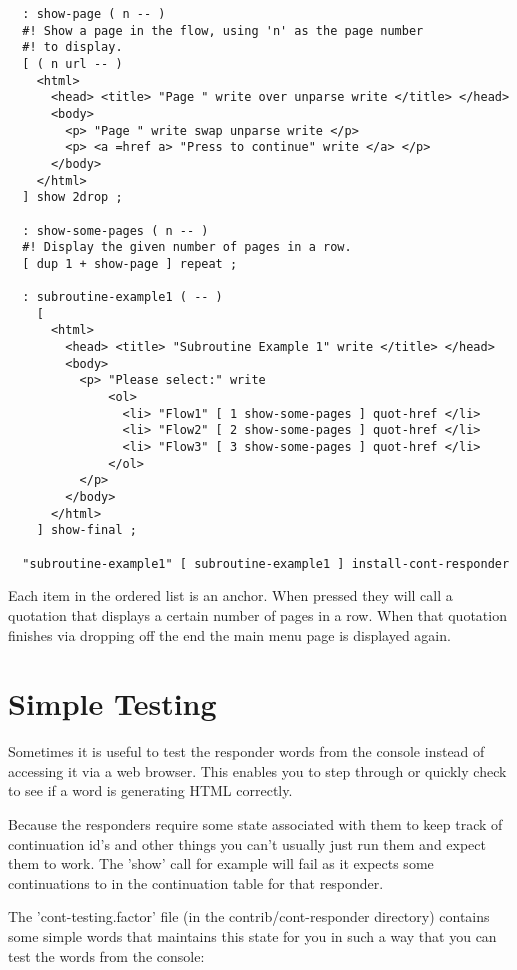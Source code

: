 \begin{verbatim}
  : show-page ( n -- )
  #! Show a page in the flow, using 'n' as the page number
  #! to display. 
  [ ( n url -- )
    <html>
      <head> <title> "Page " write over unparse write </title> </head>
      <body>
        <p> "Page " write swap unparse write </p>
        <p> <a =href a> "Press to continue" write </a> </p>
      </body>
    </html>   
  ] show 2drop ;

  : show-some-pages ( n -- )
  #! Display the given number of pages in a row.
  [ dup 1 + show-page ] repeat ;

  : subroutine-example1 ( -- )
    [
      <html>
        <head> <title> "Subroutine Example 1" write </title> </head>
        <body>
          <p> "Please select:" write 
              <ol>
                <li> "Flow1" [ 1 show-some-pages ] quot-href </li>
                <li> "Flow2" [ 2 show-some-pages ] quot-href </li>
                <li> "Flow3" [ 3 show-some-pages ] quot-href </li>
              </ol>
          </p>
        </body>
      </html>
    ] show-final ;

  "subroutine-example1" [ subroutine-example1 ] install-cont-responder
\end{verbatim}

Each item in the ordered list is an anchor. When pressed they will
call a quotation that displays a certain number of pages in a
row. When that quotation finishes via dropping off the end the main
menu page is displayed again.

\section{Simple Testing}

Sometimes it is useful to test the responder words from the console
instead of accessing it via a web browser. This enables you to step
through or quickly check to see if a word is generating HTML
correctly.

Because the responders require some state associated with them to keep
track of continuation id's and other things you can't usually just run
them and expect them to work. The 'show' call for example will fail as
it expects some continuations to in the continuation table for that
responder.

The 'cont-testing.factor' file (in the contrib/cont-responder
directory) contains some simple words that maintains this state for
you in such a way that you can test the words from the console:

